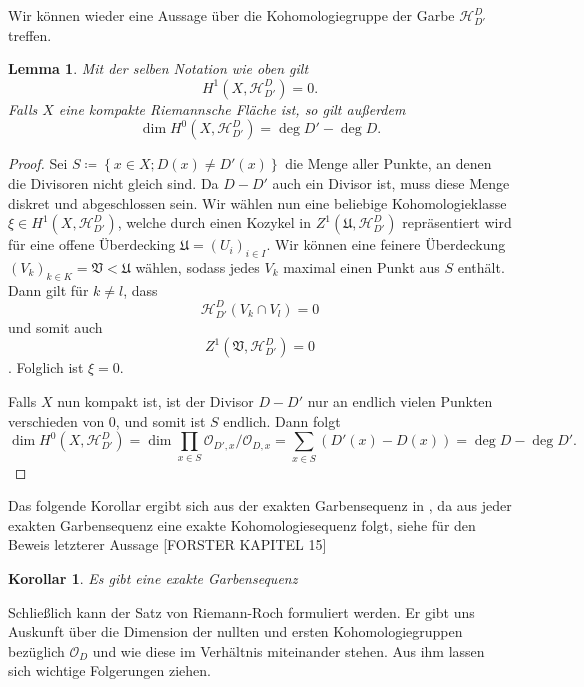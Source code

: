 \documentclass[11pt,a4paper,toc=bibliography]{scrartcl}
\theoremstyle{thm}
\newtheorem{lemma}{Lemma}[section]
\newtheorem{koro}{Korollar}[section]
\theoremstyle{def}
\theoremstyle{remark}
\begin{document}
Wir können wieder eine Aussage über die Kohomologiegruppe der Garbe $\mathcal{H}^D_{D'}$ treffen.
\begin{lemma}
	Mit der selben Notation wie oben gilt
	\[H^1(X,\mathcal{H}^D_{D'})=0.
	\]
	Falls $X$ eine kompakte Riemannsche Fläche ist, so gilt außerdem 
	\[
	\dim H^0(X,\mathcal{H}^D_{D'})=\deg D'-\deg D.
	\]
	\end{lemma}
\begin{proof}
Sei $S\coloneqq\left\{x\in X;D(x)\neq D'(x)\right\}$ die Menge aller Punkte, an denen die Divisoren nicht gleich sind. Da $D-D'$ auch ein Divisor ist, muss diese Menge diskret und abgeschlossen sein. Wir wählen nun eine beliebige Kohomologieklasse $\xi\in H^1(X,\mathcal{H}^D_{D'})$, welche durch einen Kozykel in $Z^1(\mathfrak{U},\mathcal{H}^D_{D'})$ repräsentiert wird für eine offene Überdecking $\mathfrak{U}=(U_i)_{i\in I}$. Wir können eine feinere Überdeckung $(V_k)_{k\in K}=\mathfrak{V}<\mathfrak{U}$ wählen, sodass jedes $V_k$ maximal einen Punkt aus $S$ enthält. Dann gilt für $k\neq l$, dass 
\[\mathcal{H}^D_{D'}(V_k\cap V_l)=0
\] 
und somit auch \[Z^1(\mathfrak{V},\mathcal{H}^D_{D'})=0\]. Folglich ist $\xi = 0$.

Falls $X$ nun kompakt ist, ist der Divisor $D-D'$ nur an endlich vielen Punkten verschieden von $0$, und somit ist $S$ endlich. Dann folgt
\[ \dim H^0(X,\mathcal{H}^D_{D'})=\dim \prod_{x\in S} \mathcal{O}_{D',x}/\mathcal{O}_{D,x}=\sum_{x\in S} (D'(x)-D(x))=\deg D-\deg D'.
\]

\end{proof}
Das folgende Korollar ergibt sich aus der exakten Garbensequenz in , da aus jeder exakten Garbensequenz eine exakte Kohomologiesequenz folgt, siehe für den Beweis letzterer Aussage [FORSTER KAPITEL 15]
\begin{koro}
	Es gibt eine exakte Garbensequenz
	\begin{center}
	\end{center}
\end{koro}
Schließlich kann der Satz von Riemann-Roch formuliert werden. Er gibt uns Auskunft über die Dimension der nullten und ersten Kohomologiegruppen bezüglich $\mathcal{O}_D$ und wie diese im Verhältnis miteinander stehen. Aus ihm lassen sich wichtige Folgerungen ziehen.
\end{document}
